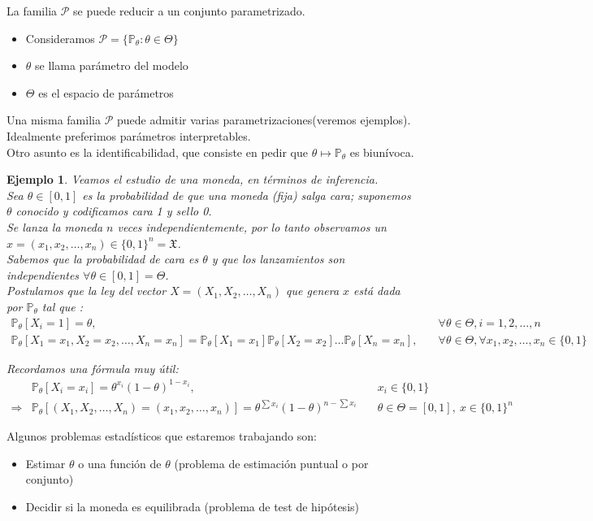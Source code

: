 \documentclass[10pt]{article}
\theoremstyle{plain}
\newtheorem{ej}{Ejemplo}
\theoremstyle{definition}
\begin{document}
La familia $\mathcal{P}$ se puede reducir a un conjunto parametrizado.
\begin{itemize}
\item Consideramos $\mathcal{P} = \{ \mathbb{P}_{\theta} \colon \theta \in \Theta\}$
\item $\theta$ se llama parámetro del modelo
\item $\Theta$ es el espacio de parámetros
\end{itemize}

Una misma familia $\mathcal{P}$ puede admitir varias parametrizaciones(veremos ejemplos). Idealmente preferimos parámetros interpretables.\\
Otro asunto es la identificabilidad, que consiste en pedir  que $\theta \mapsto \mathbb{P}_{\theta}$ es biunívoca.

\begin{ej} Veamos el estudio de una moneda, en términos de inferencia.\\
Sea $\theta \in \left[0,1\right]$ es la probabilidad de que una moneda (fija) salga cara; suponemos $\theta$ conocido y codificamos cara 1 y sello 0.\\
Se lanza la moneda $n$ veces independientemente, por lo tanto observamos un $x = (x_{1}, x_{2}, \ldots, x_{n}) \in \{0,1\}^n = \mathfrak{X}$.\\

Sabemos que la probabilidad de cara es $\theta$ y que los lanzamientos son independientes $\forall \theta \in \left[0,1\right] = \Theta$.\\
Postulamos que la ley del vector $X = (X_{1}, X_{2}, \ldots, X_{n})$ que genera $x$ está dada por $\mathbb{P}_{\theta}$ tal que :
\begin{align*}
\mathbb{P}_{\theta}\left[X_{i} = 1\right] = \theta, &\quad \forall \theta \in \Theta, i = 1,2,\ldots,n\\
\mathbb{P}_{\theta}\left[X_{1}=x_{1}, X_{2}=x_{2}, \ldots, X_{n}=x_{n}\right] = \mathbb{P}_{\theta}\left[X_{1}=x_{1}\right]\mathbb{P}_{\theta}\left[X_{2}=x_{2}\right]\ldots \mathbb{P}_{\theta}\left[X_{n}=x_{n}\right], &\quad \forall \theta \in \Theta, \forall x_{1}, x_{2}, \ldots, x_{n} \in \{0,1\}
\end{align*}

Recordamos una fórmula muy útil:
\begin{align*}
&\mathbb{P}_{\theta}\left[X_{i} = x_{i}\right] = \theta^{x_{i}}(1-\theta)^{1-x_{i}}, &\quad x_{i} \in \{0,1\}\\
\Rightarrow & \mathbb{P}_{\theta}\left[(X_{1}, X_{2}, \ldots, X_{n}) = (x_{1}, x_{2}, \ldots, x_{n})\right] = \theta^{\sum{x_{i}}}(1-\theta)^{n-\sum{x_{i}}} &\quad \theta \in \Theta = \left[0,1\right],\ x \in \{0,1\}^n
\end{align*}
\end{ej}
Algunos problemas estadísticos que estaremos trabajando son:
\begin{itemize}
\item Estimar $\theta$ o una función de $\theta$ (problema de estimación puntual o por conjunto)
\item Decidir si la moneda es equilibrada (problema de test de hipótesis)
\end{itemize}
\end{document}
